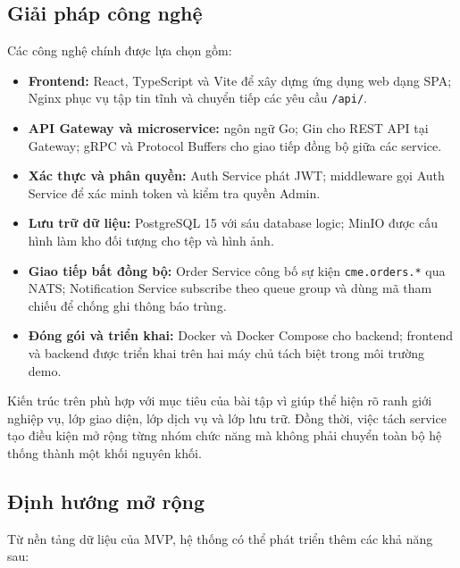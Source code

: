 \documentclass[12pt,a4paper,oneside]{report}
\begin{document}
\subsection{Giải pháp công nghệ}

Các công nghệ chính được lựa chọn gồm:

\begin{itemize}[leftmargin=1.1cm]
  \item \textbf{Frontend:} React, TypeScript và Vite để xây dựng ứng dụng web
  dạng SPA; Nginx phục vụ tập tin tĩnh và chuyển tiếp các yêu cầu
  \texttt{/api/}.

  \item \textbf{API Gateway và microservice:} ngôn ngữ Go; Gin cho REST API tại
  Gateway; gRPC và Protocol Buffers cho giao tiếp đồng bộ giữa các service.

  \item \textbf{Xác thực và phân quyền:} Auth Service phát JWT; middleware gọi
  Auth Service để xác minh token và kiểm tra quyền Admin.

  \item \textbf{Lưu trữ dữ liệu:} PostgreSQL 15 với sáu database logic; MinIO
  được cấu hình làm kho đối tượng cho tệp và hình ảnh.

  \item \textbf{Giao tiếp bất đồng bộ:} Order Service công bố sự kiện
  \texttt{cme.orders.*} qua NATS; Notification Service subscribe theo queue group
  và dùng mã tham chiếu để chống ghi thông báo trùng.

  \item \textbf{Đóng gói và triển khai:} Docker và Docker Compose cho backend;
  frontend và backend được triển khai trên hai máy chủ tách biệt trong môi
  trường demo.
\end{itemize}

Kiến trúc trên phù hợp với mục tiêu của bài tập vì giúp thể hiện rõ ranh giới
nghiệp vụ, lớp giao diện, lớp dịch vụ và lớp lưu trữ. Đồng thời, việc tách service
tạo điều kiện mở rộng từng nhóm chức năng mà không phải chuyển toàn bộ hệ thống
thành một khối nguyên khối.

\subsection{Định hướng mở rộng}

Từ nền tảng dữ liệu của MVP, hệ thống có thể phát triển thêm các khả năng sau:
\end{document}
